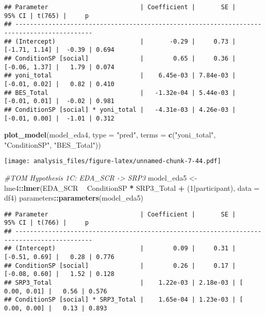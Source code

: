 \documentclass[
]{article}
\newenvironment{Shaded}{\begin{snugshade}}{\end{snugshade}}
\newcommand{\CommentTok}[1]{\textcolor[rgb]{0.56,0.35,0.01}{\textit{#1}}}
\newcommand{\DataTypeTok}[1]{\textcolor[rgb]{0.13,0.29,0.53}{#1}}
\newcommand{\DecValTok}[1]{\textcolor[rgb]{0.00,0.00,0.81}{#1}}
\newcommand{\KeywordTok}[1]{\textcolor[rgb]{0.13,0.29,0.53}{\textbf{#1}}}
\newcommand{\NormalTok}[1]{#1}
\newcommand{\OperatorTok}[1]{\textcolor[rgb]{0.81,0.36,0.00}{\textbf{#1}}}
\newcommand{\StringTok}[1]{\textcolor[rgb]{0.31,0.60,0.02}{#1}}
\begin{document}
\begin{verbatim}
## Parameter                         | Coefficient |       SE |        95% CI | t(765) |     p
## -------------------------------------------------------------------------------------------
## (Intercept)                       |       -0.29 |     0.73 | [-1.71, 1.14] |  -0.39 | 0.694
## ConditionSP [social]              |        0.65 |     0.36 | [-0.06, 1.37] |   1.79 | 0.074
## yoni_total                        |    6.45e-03 | 7.84e-03 | [-0.01, 0.02] |   0.82 | 0.410
## BES_Total                         |   -1.32e-04 | 5.44e-03 | [-0.01, 0.01] |  -0.02 | 0.981
## ConditionSP [social] * yoni_total |   -4.31e-03 | 4.26e-03 | [-0.01, 0.00] |  -1.01 | 0.312
\end{verbatim}

\begin{Shaded}
\begin{Highlighting}[]
\KeywordTok{plot_model}\NormalTok{(model_eda4, }\DataTypeTok{type =} \StringTok{"pred"}\NormalTok{, }\DataTypeTok{terms =} \KeywordTok{c}\NormalTok{(}\StringTok{"yoni_total"}\NormalTok{, }\StringTok{"ConditionSP"}\NormalTok{, }\StringTok{"BES_Total"}\NormalTok{))}
\end{Highlighting}
\end{Shaded}

\texttt{[image: analysis\_files/figure-latex/unnamed-chunk-7-44.pdf]}

\begin{Shaded}
\begin{Highlighting}[]
\CommentTok{#TOM Hypothesis 1C: EDA_SCR -> SRP3}
\NormalTok{model_eda5 <-}\StringTok{ }\NormalTok{lme4}\OperatorTok{::}\KeywordTok{lmer}\NormalTok{(EDA_SCR }\OperatorTok{~}\StringTok{ }\NormalTok{ConditionSP }\OperatorTok{*}\StringTok{ }\NormalTok{SRP3_Total }\OperatorTok{+}\StringTok{ }\NormalTok{(}\DecValTok{1}\OperatorTok{|}\NormalTok{participant), }\DataTypeTok{data =}\NormalTok{ df4)}
\NormalTok{parameters}\OperatorTok{::}\KeywordTok{parameters}\NormalTok{(model_eda5)}
\end{Highlighting}
\end{Shaded}

\begin{verbatim}
## Parameter                         | Coefficient |       SE |        95% CI | t(766) |     p
## -------------------------------------------------------------------------------------------
## (Intercept)                       |        0.09 |     0.31 | [-0.51, 0.69] |   0.28 | 0.776
## ConditionSP [social]              |        0.26 |     0.17 | [-0.08, 0.60] |   1.52 | 0.128
## SRP3_Total                        |    1.22e-03 | 2.18e-03 | [ 0.00, 0.01] |   0.56 | 0.576
## ConditionSP [social] * SRP3_Total |    1.65e-04 | 1.23e-03 | [ 0.00, 0.00] |   0.13 | 0.893
\end{verbatim}
\end{document}
